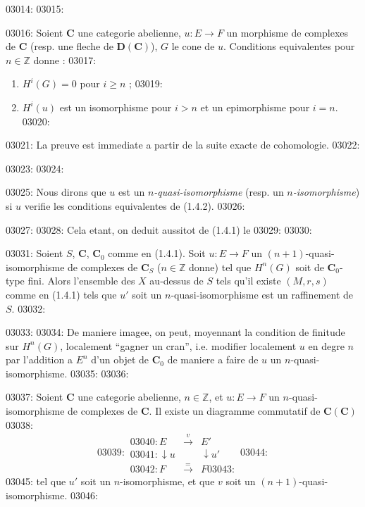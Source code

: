 03014: 
03015: \begin{lemme}[1.4.2]
03016: Soient $\mathbf{C}$ une categorie abelienne, $u : E \to F$ un morphisme de complexes de $\mathbf{C}$ (resp. une fleche de $\mathbf{D}(\mathbf{C})$), $G$ le cone de $u$. Conditions equivalentes pour $n \in \mathbb{Z}$ donne :
03017: \begin{enumerate}
03018: \item[(i)] $H^i(G) = 0$ pour $i \geq n$ ;
03019: \item[(ii)] $H^i(u)$ est un isomorphisme pour $i > n$ et un epimorphisme pour $i = n$.
03020: \end{enumerate}
03021: La preuve est immediate a partir de la suite exacte de cohomologie.
03022: \end{lemme}
03023: 
03024: \begin{definition}[1.4.3]
03025: Nous dirons que $u$ est un \emph{$n$-quasi-isomorphisme} (resp. un \emph{$n$-isomorphisme}) si $u$ verifie les conditions equivalentes de (1.4.2).
03026: \end{definition}
03027: 
03028: Cela etant, on deduit aussitot de (1.4.1) le
03029: 
03030: \begin{corollaire}[1.4.4]
03031: Soient $S$, $\mathbf{C}$, $\mathbf{C}_0$ comme en (1.4.1). Soit $u : E \to F$ un $(n+1)$-quasi-isomorphisme de complexes de $\mathbf{C}_S$ ($n \in \mathbb{Z}$ donne) tel que $H^n(G)$ soit de $\mathbf{C}_0$-type fini. Alors l'ensemble des $X$ au-dessus de $S$ tels qu'il existe $(M, r, s)$ comme en (1.4.1) tels que $u'$ soit un $n$-quasi-isomorphisme est un raffinement de $S$.
03032: \end{corollaire}
03033: 
03034: De maniere imagee, on peut, moyennant la condition de finitude sur $H^n(G)$, localement ``gagner un cran'', i.e. modifier localement $u$ en degre $n$ par l'addition a $E^n$ d'un objet de $\mathbf{C}_0$ de maniere a faire de $u$ un $n$-quasi-isomorphisme.
03035: 
03036: \begin{corollaire}[1.4.5]
03037: Soient $\mathbf{C}$ une categorie abelienne, $n \in \mathbb{Z}$, et $u : E \to F$ un $n$-quasi-isomorphisme de complexes de $\mathbf{C}$. Il existe un diagramme commutatif de $\mathbf{C}(\mathbf{C})$
03038: \[
03039: \begin{array}{ccc}
03040: E & \xrightarrow{v} & E' \\
03041: \downarrow{u} & & \downarrow{u'} \\
03042: F & \xrightarrow{=} & F
03043: \end{array}
03044: \]
03045: tel que $u'$ soit un $n$-isomorphisme, et que $v$ soit un $(n+1)$-quasi-isomorphisme.
03046: \end{corollaire}
